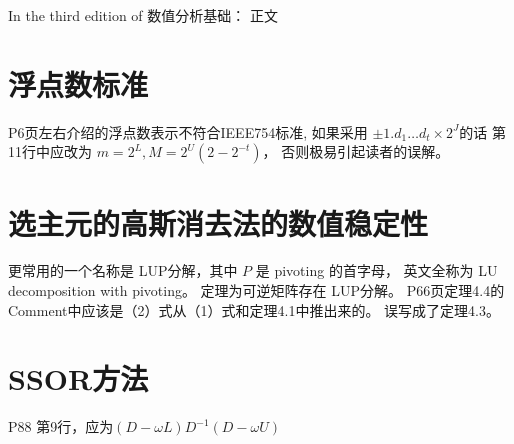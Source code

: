 \documentclass{ctexart}
\begin{document}
    In the third edition of 数值分析基础：
正文
\section{浮点数标准}
    P6页左右介绍的浮点数表示不符合IEEE754标准,
    如果采用 $\pm 1.d_1\dots d_t \times 2^J$的话
    第11行中应改为 $m=2^L, M=2^U(2-2^{-t})$，
    否则极易引起读者的误解。
\section{选主元的高斯消去法的数值稳定性}
更常用的一个名称是 LUP分解，其中 $P$ 是 pivoting 的首字母，
英文全称为 LU decomposition with pivoting。
定理为可逆矩阵存在 LUP分解。
P66页定理4.4的Comment中应该是（2）式从（1）式和定理4.1中推出来的。
误写成了定理4.3。
\section{SSOR方法}
P88 第9行，应为$(D-\omega L)D^{-1}(D-\omega U)$
\end{document}
